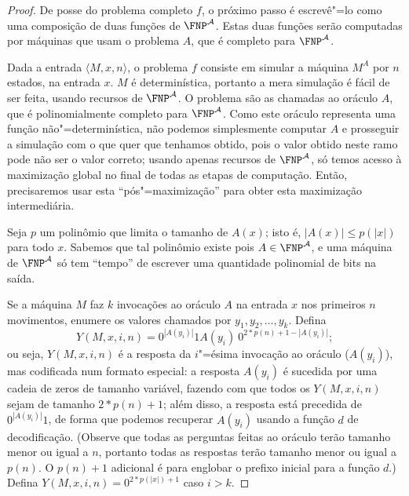 \begin{proof}
    De posse do problema completo $f$,
    o próximo passo é escrevê"=lo como uma composição
    de duas funções de $\FNP^\mathcal A$.
    Estas duas funções serão computadas por máquinas
    que usam o problema $A$,
    que é completo para $\FNP^\mathcal A$.

    Dada a entrada $\langle M, x, n \rangle$,
    o problema $f$ consiste em simular a máquina $M^A$ por $n$ estados,
    na entrada $x$.
    $M$ é determinística, portanto a mera simulação é fácil de ser feita,
    usando recursos de $\FNP^\mathcal A$.
    O problema são as chamadas ao oráculo $A$,
    que é polinomialmente completo para $\FNP^\mathcal A$.
    Como este oráculo representa uma função não"=determinística,
    não podemos simplesmente computar $A$
    e prosseguir a simulação com o que quer que tenhamos obtido,
    pois o valor obtido neste ramo
    pode não ser o valor correto;
    usando apenas recursos de $\FNP^\mathcal A$,
    só temos acesso à maximização global
    no final de todas as etapas de computação.
    Então, precisaremos usar esta ``pós"=maximização''
    para obter esta maximização intermediária.

    Seja $p$ um polinômio que limita o tamanho de $A(x)$;
    isto é, $|A(x)| \leq p(|x|)$ para todo $x$.
    Sabemos que tal polinômio existe
    pois $A \in \FNP^\mathcal A$,
    e uma máquina de $\FNP^\mathcal A$ só tem ``tempo''
    de escrever uma quantidade polinomial de bits na saída.

    Se a máquina $M$ faz $k$ invocações ao oráculo $A$ na entrada $x$
    nos primeiros $n$ movimentos,
    enumere os valores chamados por $y_1, y_2, \dots, y_k$.
    Defina
    \begin{equation*}
        Y(M, x, i, n) = 0^{|A(y_i)|} 1 A(y_i)\ 0^{2*p(n)+1 - |A(y_i)|};
    \end{equation*}
    ou seja, $Y(M, x, i, n)$ é a resposta da $i$"=ésima invocação ao oráculo ($A(y_i)$),
    mas codificada num formato especial:
    a resposta $A(y_i)$ é sucedida por uma cadeia de zeros de tamanho variável,
    fazendo com que todos os $Y(M, x, i, n)$ sejam de tamanho $2*p(n) + 1$;
    além disso, a resposta está precedida de $0^{|A(y_i)|}1$,
    de forma que podemos recuperar $A(y_i)$
    usando a função $d$ de decodificação.
    (Observe que todas as perguntas feitas ao oráculo
    terão tamanho menor ou igual a $n$,
    portanto todas as respostas terão tamanho menor ou igual a $p(n)$.
    O $p(n)+1$ adicional é para englobar o prefixo inicial para a função $d$.)
    Defina $Y(M, x, i, n) = 0^{2*p(|x|)+1}$ caso $i > k$.


\end{proof}
